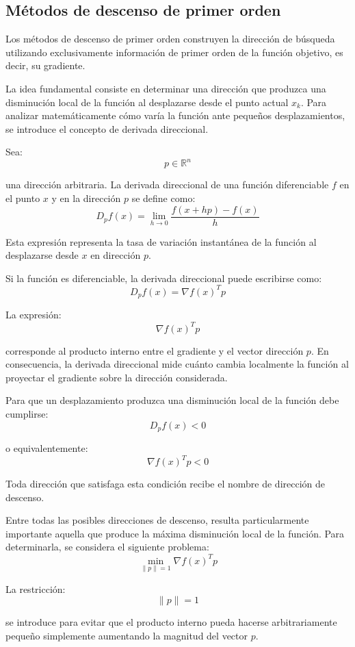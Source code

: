 \subsection{Métodos de descenso de primer orden}

Los métodos de descenso de primer orden construyen la dirección de búsqueda utilizando exclusivamente información de primer orden de la función objetivo, es decir, su gradiente.

La idea fundamental consiste en determinar una dirección que produzca una disminución local de la función al desplazarse desde el punto actual \(x_k\). Para analizar matemáticamente cómo varía la función ante pequeños desplazamientos, se introduce el concepto de derivada direccional.

Sea:
\[
p\in\mathbb{R}^n
\]

una dirección arbitraria. La derivada direccional de una función diferenciable \(f\) en el punto \(x\) y en la dirección \(p\) se define como:
\[
D_pf(x)=
\lim_{h\to0}
\frac{f(x+hp)-f(x)}{h}
\]

Esta expresión representa la tasa de variación instantánea de la función al desplazarse desde \(x\) en dirección \(p\).

Si la función es diferenciable, la derivada direccional puede escribirse como:
\[
D_pf(x)=\nabla f(x)^Tp
\]

La expresión:
\[
\nabla f(x)^Tp
\]

corresponde al producto interno entre el gradiente y el vector dirección \(p\). En consecuencia, la derivada direccional mide cuánto cambia localmente la función al proyectar el gradiente sobre la dirección considerada.

Para que un desplazamiento produzca una disminución local de la función debe cumplirse:
\[
D_pf(x)<0
\]

o equivalentemente:
\[
\nabla f(x)^Tp<0
\]

Toda dirección que satisfaga esta condición recibe el nombre de dirección de descenso.

Entre todas las posibles direcciones de descenso, resulta particularmente importante aquella que produce la máxima disminución local de la función. Para determinarla, se considera el siguiente problema:
\[
\min_{\|p\|=1}\nabla f(x)^Tp
\]

La restricción:
\[
\|p\|=1
\]

se introduce para evitar que el producto interno pueda hacerse arbitrariamente pequeño simplemente aumentando la magnitud del vector \(p\).

